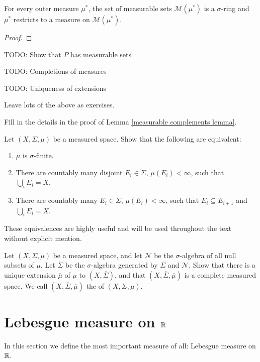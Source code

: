 \begin{lemma}
For every outer measure $\mu^*$, the set of measurable sets $\mathcal M(\mu^*)$ is a $\sigma$-ring and $\mu^*$ restricts to a measure on $\mathcal M(\mu^*)$.
\end{lemma}
\begin{proof}

\end{proof}



TODO: Show that $P$ has measurable sets

TODO: Completions of measures

TODO: Uniqueness of extensions

Leave lots of the above as exercises.

\begin{exercise}
\label{measurable complements}
Fill in the details in the proof of Lemma \ref{measurable complements lemma}.
\end{exercise}

\begin{exercise}
Let $(X, \Sigma, \mu)$ be a measured space. Show that the following are equivalent:
\begin{enumerate}
\item $\mu$ is $\sigma$-finite.
\item There are countably many disjoint $E_{i} \in \Sigma$, $\mu(E_i) < \infty$, such that $\bigcup_{i} E_{i} = X$.
\item There are countably many $E_{i} \in \Sigma$, $\mu(E_i) < \infty$, such that $E_{i} \subseteq E_{i+1}$ and $\bigcup_{i} E_{i} = X$.
\end{enumerate}
These equivalences are highly useful and will be used throughout the text without explicit mention.
\end{exercise}

\begin{exercise}
Let $(X, \Sigma, \mu)$ be a measured space, and let $\mathcal N$ be the $\sigma$-algebra of all null subsets of $\mu$. Let $\overline \Sigma$ be the $\sigma$-algebra generated by $\Sigma$ and $\mathcal N$.
Show that there is a unique extension $\overline \mu$ of $\mu$ to $(X, \overline \Sigma)$, and that $(X, \overline \Sigma, \overline \mu)$ is a complete measured space.
We call $(X, \overline \Sigma, \overline \mu)$ the  of $(X, \Sigma, \mu)$.
\end{exercise}

\section{Lebesgue measure on $\mathbb{R}$}
In this section we define the most important measure of all: Lebesgue measure on $\mathbb{R}$.

